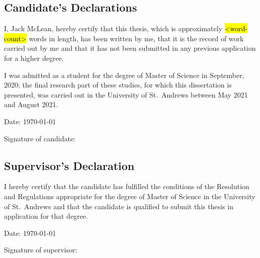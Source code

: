 %
%

\begin{declaration}
\subsection*{Candidate's Declarations}
I, Jack McLean, hereby certify that this thesis, which is approximately \hl{<word-count>} words in length, has been written by me, that it is the record of work carried out by me and that it has not been submitted in any previous application for a higher degree.

I was admitted as a student for the degree of Master of Science in September, 2020; the final research part of these studies, for which this dissertation is presented, was carried out in the University of St.\ Andrews between May 2021 and August 2021.
\vspace{24pt}

Date: \today
\vspace{16pt}

Signature of candidate:
\vspace{48pt}


\subsection*{Supervisor's Declaration}
I hereby certify that the candidate has fulfilled the conditions of the Resolution and Regulations appropriate for the degree of Master of Science in the University of St.\ Andrews and that the candidate is qualified to submit this thesis in application for that degree.
\vspace{24pt}

Date: \today
\vspace{16pt}

Signature of supervisor:
\end{declaration}